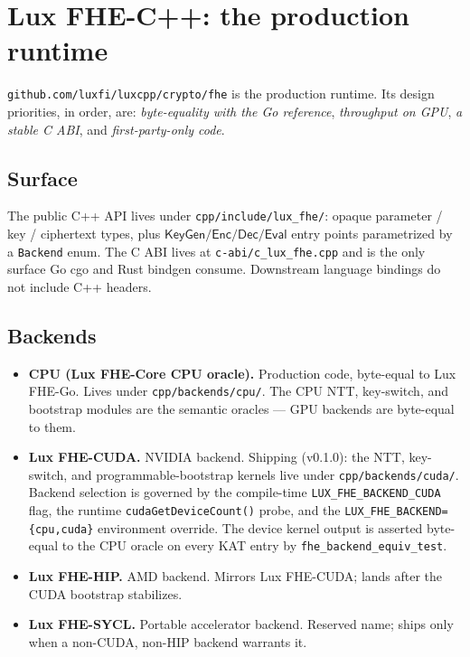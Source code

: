 \section{Lux FHE-C++: the production runtime}
\label{sec:fhe-cpp-production-runtime}

\texttt{github.com/luxfi/luxcpp/crypto/fhe} is the production runtime.
Its design priorities, in order, are: \emph{byte-equality with the
Go reference}, \emph{throughput on GPU}, \emph{a stable C ABI}, and
\emph{first-party-only code}.

\subsection{Surface}

The public C++ API lives under \texttt{cpp/include/lux\_fhe/}: opaque
parameter / key / ciphertext types, plus
$\mathsf{KeyGen}/\mathsf{Enc}/\mathsf{Dec}/\mathsf{Eval}$ entry points
parametrized by a \texttt{Backend} enum. The C ABI lives at
\texttt{c-abi/c\_lux\_fhe.cpp} and is the only surface Go cgo and
Rust bindgen consume. Downstream language bindings do not include C++
headers.

\subsection{Backends}

\begin{itemize}
\item \textbf{CPU (Lux FHE-Core CPU oracle).} Production code, byte-equal
to Lux FHE-Go. Lives under \texttt{cpp/backends/cpu/}. The CPU NTT, key-switch,
and bootstrap modules are the semantic oracles --- GPU backends are
byte-equal to them.
\item \textbf{Lux FHE-CUDA.} NVIDIA backend. Shipping (v0.1.0): the
NTT, key-switch, and programmable-bootstrap kernels live under
\texttt{cpp/backends/cuda/}. Backend selection is governed by the
compile-time \texttt{LUX\_FHE\_BACKEND\_CUDA} flag, the runtime
\texttt{cudaGetDeviceCount()} probe, and the
\texttt{LUX\_FHE\_BACKEND=\{cpu,cuda\}} environment override. The
device kernel output is asserted byte-equal to the CPU oracle on every
KAT entry by \texttt{fhe\_backend\_equiv\_test}.
\item \textbf{Lux FHE-HIP.} AMD backend. Mirrors Lux FHE-CUDA; lands
after the CUDA bootstrap stabilizes.
\item \textbf{Lux FHE-SYCL.} Portable accelerator backend. Reserved
name; ships only when a non-CUDA, non-HIP backend warrants it.
\end{itemize}

